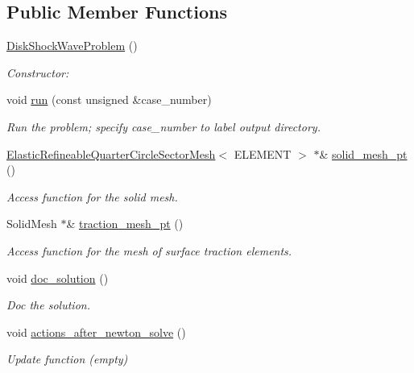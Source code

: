 \subsection*{Public Member Functions}
\begin{DoxyCompactItemize}
\item 
\hyperlink{classDiskShockWaveProblem_ae670d0120936f410134ba3e3b61aa880}{Disk\+Shock\+Wave\+Problem} ()
\begin{DoxyCompactList}\small\item\em Constructor\+: \end{DoxyCompactList}\item 
void \hyperlink{classDiskShockWaveProblem_af8dc3befd3eba59b008c315bfe077340}{run} (const unsigned \&case\+\_\+number)
\begin{DoxyCompactList}\small\item\em Run the problem; specify case\+\_\+number to label output directory. \end{DoxyCompactList}\item 
\hyperlink{classElasticRefineableQuarterCircleSectorMesh}{Elastic\+Refineable\+Quarter\+Circle\+Sector\+Mesh}$<$ E\+L\+E\+M\+E\+NT $>$ $\ast$\& \hyperlink{classDiskShockWaveProblem_a558dc0ca72e4e1974c98cdf5203d015b}{solid\+\_\+mesh\+\_\+pt} ()
\begin{DoxyCompactList}\small\item\em Access function for the solid mesh. \end{DoxyCompactList}\item 
Solid\+Mesh $\ast$\& \hyperlink{classDiskShockWaveProblem_aade14ed9df7e698c3e90abea96090ab5}{traction\+\_\+mesh\+\_\+pt} ()
\begin{DoxyCompactList}\small\item\em Access function for the mesh of surface traction elements. \end{DoxyCompactList}\item 
void \hyperlink{classDiskShockWaveProblem_a7685309caac199d18f3f81468d9fcb23}{doc\+\_\+solution} ()
\begin{DoxyCompactList}\small\item\em Doc the solution. \end{DoxyCompactList}\item 
void \hyperlink{classDiskShockWaveProblem_a46f6a25da58128f6abfdbbe92ea49d11}{actions\+\_\+after\+\_\+newton\+\_\+solve} ()
\begin{DoxyCompactList}\small\item\em Update function (empty) \end{DoxyCompactList}\item 

\end{DoxyCompactItemize}
